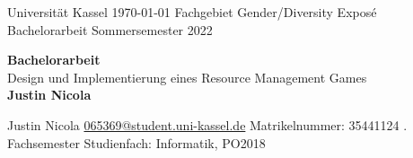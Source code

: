 \thispagestyle{empty}

\begin{flushleft}
	Universität Kassel \hfill \today \linebreak
	Fachgebiet Gender/Diversity \linebreak
	Exposé Bachelorarbeit \linebreak
	Sommersemester 2022 \linebreak
\end{flushleft}

\vfill

\begin{center}
	{\Huge \bfseries Bachelorarbeit} \\[12pt]
	{\huge Design und Implementierung eines Resource Management Games} \\[24pt]
	{\Large \bfseries Justin Nicola}
\end{center}

\vfill
\vfill

\begin{flushleft}
	Justin Nicola \linebreak
	\href{mailto:065369@student.uni-kassel.de}{065369@student.uni-kassel.de} \linebreak
	Matrikelnummer: 35441124 . Fachsemester \linebreak
	Studienfach: Informatik, PO2018
\end{flushleft}


